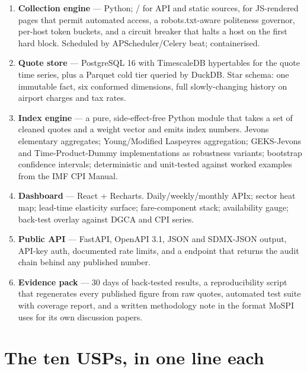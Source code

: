\begin{enumerate}[label=\textbf{\alph*.}]
\item \textbf{Collection engine} --- Python; / for API and static
sources,  for JS-rendered pages that permit automated access, a
robots.txt-aware politeness governor, per-host token buckets, and a circuit breaker that
halts a host on the first hard block. Scheduled by APScheduler/Celery beat; containerised.

\item \textbf{Quote store} --- PostgreSQL 16 with TimescaleDB hypertables for the quote
time series, plus a Parquet cold tier queried by DuckDB. Star schema: one immutable
 fact, six conformed dimensions, full slowly-changing history on
airport charges and tax rates.

\item \textbf{Index engine} --- a pure, side-effect-free Python module that takes a set of
cleaned quotes and a weight vector and emits index numbers. Jevons elementary aggregates;
Young/Modified Laspeyres aggregation; GEKS-Jevons and Time-Product-Dummy implementations
as robustness variants; bootstrap confidence intervals; deterministic and unit-tested
against worked examples from the IMF CPI Manual.

\item \textbf{Dashboard} --- React + Recharts. Daily/weekly/monthly APIx; sector heat map;
lead-time elasticity surface; fare-component stack; availability gauge; back-test overlay
against DGCA and CPI series.

\item \textbf{Public API} --- FastAPI, OpenAPI 3.1, JSON and SDMX-JSON output, API-key
auth, documented rate limits, and a  endpoint that returns the audit
chain behind any published number.

\item \textbf{Evidence pack} --- 30 days of back-tested results, a reproducibility script
that regenerates every published figure from raw quotes, automated test suite with
coverage report, and a written methodology note in the format MoSPI uses for its own
discussion papers.
\end{enumerate}

\section{The ten USPs, in one line each}


